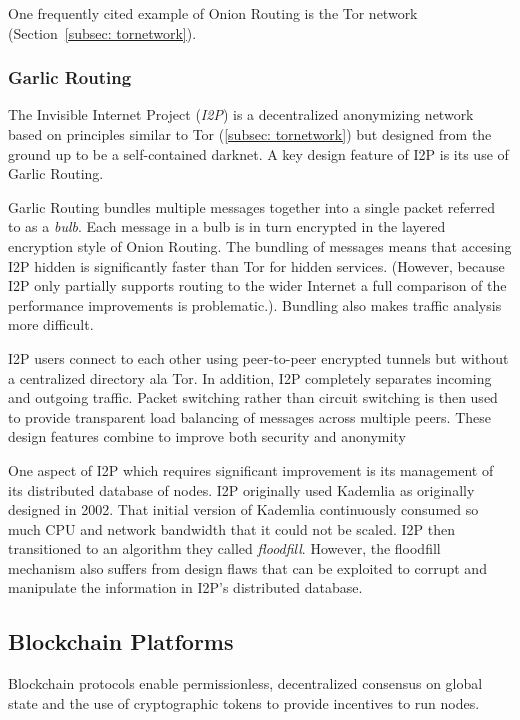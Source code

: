One frequently cited example of Onion Routing is the Tor network (Section~\ref{subsec: tornetwork}).

\subsubsection{Garlic Routing}
\label{subsec-garlicrouting}
The Invisible Internet Project (\textit{I2P}) is a decentralized anonymizing network based on principles similar to Tor (\ref{subsec: tornetwork}) but designed from the ground up to be a self-contained darknet. A key design feature of I2P is its use of Garlic Routing\cite{26}.


Garlic Routing bundles multiple messages together into a single packet referred to as a \textit{bulb}. Each message in a bulb is in turn encrypted in the layered encryption style of Onion Routing. The bundling of messages means that accesing I2P hidden is significantly faster than Tor for hidden services. (However, because I2P only partially supports routing to the wider Internet a full comparison of the performance improvements is problematic.). Bundling also makes traffic analysis more difficult.

I2P users connect to each other using peer-to-peer encrypted tunnels but without a centralized directory ala Tor. In addition, I2P completely separates incoming and outgoing traffic. Packet switching rather than circuit switching is then used to provide transparent load balancing of messages across multiple peers. These design features combine to improve both security and anonymity

One aspect of I2P which requires significant improvement is its management of its distributed database of nodes. I2P originally used Kademlia as originally designed in 2002\cite{27}. That initial version of Kademlia continuously consumed so much CPU and network bandwidth that it could not be scaled. I2P then transitioned to an algorithm they called \textit{floodfill}. However, the floodfill mechanism also suffers from design flaws that can be exploited to corrupt and manipulate the information in I2P's distributed database\cite{28}.


\subsection{Blockchain Platforms}
Blockchain protocols enable permissionless, decentralized consensus on global state and the use of cryptographic tokens to provide incentives to run nodes.

